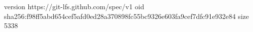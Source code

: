 version https://git-lfs.github.com/spec/v1
oid sha256:f98ff5abd654cef5afd0ed28a370898fc55bc9326e603fa9cef7dfc91e932e84
size 5338
